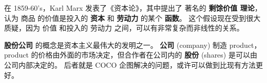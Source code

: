 \documentclass[12pt, orivec]{article}
\newcommand{\cc}[2]{#1}
\newcommand{\cc}[2]{#2}
\begin{document}
\cc{
	在 1859-60's，Karl Marx 发表了《资本论》，其中提出了 著名的 \textbf{剩馀价值 理论}，认为 商品 的价值是投入的 \textbf{资本} 和 \textbf{劳动力} 的某个 \textbf{函数}。  这个假设现在受到很大质疑，因为 价值 和投入的 劳动力 之间，可以有非常复杂而非线性的关系。 
}{
	Around 1859-60's, Karl Marx published \textit{Das Kapital}, in which he posited the now-famous theory of \textbf{surplus values}.  According to this view, the value of a commodity is construed as a function of the input of \textbf{capital} and \textbf{labor}.  Currently, this assumption is thrown into great doubt because the value of a product may depend on input labor in highly complex and non-linear relations.
}

\cc{
	\textbf{股份公司} 的概念是资本主义最伟大的发明之一。  \textbf{公司} (company) 制造 product，product 的价格由外面的市场决定，但合作者在公司内的 \textbf{股份} (shares) 是可以由公司内部决定的。  后者就是 COCO 企图解决的问题，或许可以做到比现有方法更好。
}{
	Economists would agree that the notion of \textbf{joint-stock companies} is one of the greatest inventions of capitalism.  While prices are determined externally by markets, the shares of a company that a participant owns can be decided internally by the company.  The goal of COCO is to provide a (hopefully) better method of distributing shares for online companies.
}

\fi

\printbibliography
\end{document}
